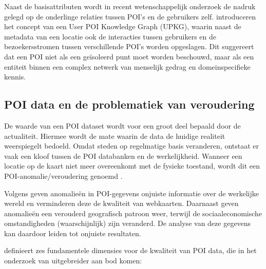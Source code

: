 Naast de basisattributen wordt in recent wetenschappelijk onderzoek de nadruk gelegd op de onderlinge relaties tussen POI's en de gebruikers zelf. \textcite{Pervin2025} introduceren het concept van een User POI Knowledge Graph (UPKG), waarin naast de metadata van een locatie ook de interacties tussen gebruikers en de bezoekersstromen tussen verschillende POI's worden opgeslagen. Dit suggereert dat een POI niet als een geïsoleerd punt moet worden beschouwd, maar als een entiteit binnen een complex netwerk van menselijk gedrag en domeinspecifieke kennis.

\subsection{POI data en de problematiek van veroudering}
De waarde van een POI dataset wordt voor een groot deel bepaald door de actualiteit. Hiermee wordt de mate waarin de data de huidige realiteit weerspiegelt bedoeld. Omdat steden op regelmatige basis veranderen, ontstaat er vaak een kloof tussen de POI databanken en de werkelijkheid. Wanneer een locatie op de kaart niet meer overeenkomt met de fysieke toestand, wordt dit een POI-anomalie/veroudering genoemd \autocite{Chuang2018}.

Volgens \textcite{Yao2024} geven anomalieën in POI-gegevens onjuiste informatie over de werkelijke wereld en verminderen deze de kwaliteit van webkaarten. Daarnaast geven anomalieën een verouderd geografisch patroon weer, terwijl de sociaaleconomische omstandigheden (waarschijnlijk) zijn veranderd. De analyse van deze gegevens kan daardoor leiden tot onjuiste resultaten.

\textcite{ISO2013} definieert zes fundamentele dimensies voor de kwaliteit van POI data, die in het onderzoek van \textcite{Yeow2021} uitgebreider aan bod komen: 

